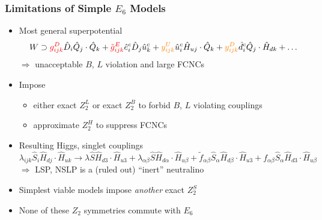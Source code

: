\documentclass[10pt,aspectratio=169]{beamer}
\begin{document}
\begin{frame}
  \frametitle{Limitations of Simple $E_6$ Models}
  \begin{itemize}\itemsep0.8em
  \item Most general superpotential
    \begin{equation*}
      W \supset {\color{red} g_{ijk}^D} \hat{D}_i \hat{Q}_j \cdot \hat{Q}_k
      + {\color{red} \tilde{g}_{ijk}^E} \hat{e}_i^c \hat{D}_j \hat{u}_k^c
      + {\color{orange} y_{ijk}^U} \hat{u}_i^c \hat{H}_{uj} \cdot \hat{Q}_k
      + {\color{orange} y_{ijk}^D} \hat{d}_i^c \hat{Q}_j \cdot
      \hat{H}_{dk} + \ldots
    \end{equation*}
    $\Rightarrow$ {\color{red} unacceptable $B$, $L$ violation} and
        {\color{orange} large FCNCs}
      \item Impose
        \begin{itemize}
          \item either exact $Z_2^L$ or exact $Z_2^B$ to forbid
            $B$, $L$ violating couplings
          \item approximate $Z_2^H$ to suppress FCNCs
        \end{itemize}
    \item Resulting Higgs, singlet couplings
      \begin{equation*}
        \lambda_{ijk} \hat{S}_i \hat{H}_{dj} \cdot \hat{H}_{uk}
        \rightarrow \lambda \hat{S} \hat{H}_{d3} \cdot \hat{H}_{u3}
        + \lambda_{\alpha\beta} \hat{S} \hat{H}_{d\alpha} \cdot
        \hat{H}_{u\beta} + \tilde{f}_{\alpha\beta} \hat{S}_\alpha
        \hat{H}_{d\beta} \cdot \hat{H}_{u3} + f_{\alpha\beta}
        \hat{S}_\alpha \hat{H}_{d3} \cdot \hat{H}_{u\beta}
      \end{equation*}
      $\Rightarrow$ LSP, NSLP is a (ruled out) ``inert'' neutralino
    \item Simplest viable models impose \emph{another} exact $Z_2^S$
    \item \alert{None of these $Z_2$ symmetries commute with $E_6$}
  \end{itemize}
\end{frame}
\end{document}
